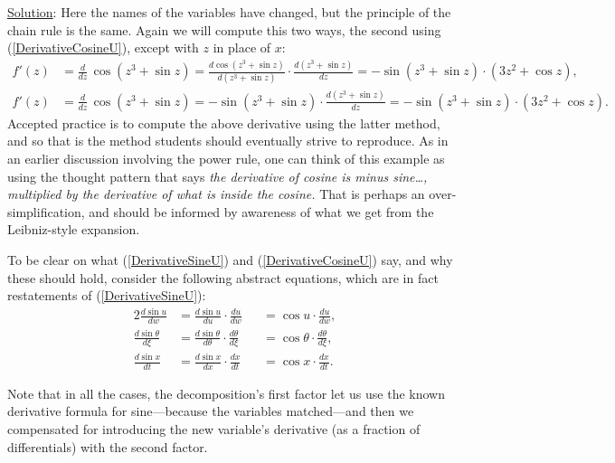 \underline{Solution}: Here the names of the variables have changed,
but the principle of the chain rule is the same.  Again we will
compute this two ways, the second
 using (\ref{DerivativeCosineU}),
except with $z$ in place of $x$:
\begin{align*}
f'(z)&=\frac{d}{dz}\,\cos(z^3+\sin z)
      =\frac{d\cos(z^3+\sin z)}{d(z^3+\sin z)}
         \cdot\frac{d(z^3+\sin z)}{dz}
      =-\sin(z^3+\sin z)\cdot(3z^2+\cos z),\\
f'(z)&=\frac{d}{dz}\,\cos(z^3+\sin z)
      =-\sin(z^3+\sin z)\cdot\frac{d(z^3+\sin z)}{dz}
      =-\sin(z^3+\sin z)\cdot(3z^2+\cos z).
\end{align*}
\eex
Accepted practice is to compute the above derivative using the latter
method, and so that is the method students should eventually strive to
reproduce. As in an earlier discussion involving the power
rule, one can think of this example as using the thought pattern
that says {\it the derivative of cosine is minus sine\dots,
multiplied by the derivative of what is inside the cosine. }%
That is perhaps an over-simplification, and should be informed by awareness
of what we get from the Leibniz-style expansion.

To be clear on what (\ref{DerivativeSineU}) and (\ref{DerivativeCosineU})
say, and why these should hold, consider the following abstract
equations, which are in fact restatements of (\ref{DerivativeSineU}):%
\footnotemark
\begin{alignat*}{2}
\frac{d\sin u}{dw}&=\frac{d\sin u}{du}\cdot\frac{du}{dw}
                  &&=\cos u\cdot\frac{du}{dw},\\
\frac{d\sin\theta}{d\xi}&=\frac{d\sin\theta}{d\theta}\cdot\frac{d\theta}{d\xi}
                  &&=\cos\theta\cdot\frac{d\theta}{d\xi},\\
\frac{d\sin x}{dt}&=\frac{d\sin x}{dx}\cdot\frac{dx}{dt}
                  &&=\cos x\cdot\frac{dx}{dt}.\end{alignat*}

\noindent Note that in all the cases, the decomposition's first
factor let us use the known derivative formula for sine---because
the variables matched---and then we compensated for introducing
the new variable's derivative (as a fraction of differentials)
with the second factor.


